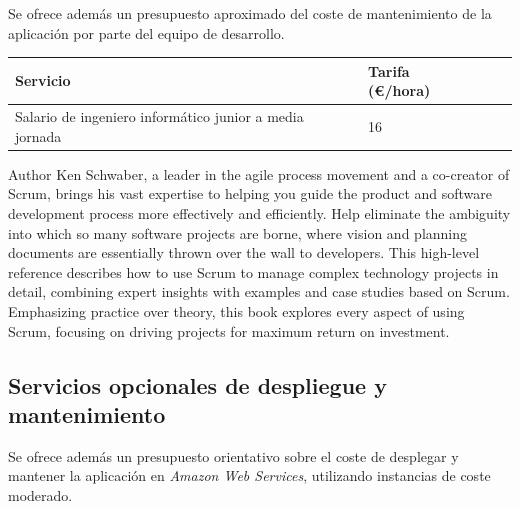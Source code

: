 \documentclass[10pt, a4paper]{aqademic}
\begin{document}
Se ofrece además un presupuesto aproximado del coste de mantenimiento de la aplicación por parte del equipo de desarrollo.

\begin{table}[h!]
	\begin{center}
		\begin{tabular}{|l|l|l|l|}
			\hline
			\rowcolor[HTML]{EFEFEF} 
			\textbf{Servicio}                   & \textbf{Tarifa (€/hora)} \\ \hline
			Salario de ingeniero informático junior a media jornada & 16   \\ \hline
		\end{tabular}
	\end{center}
\end{table}
 Author Ken Schwaber, a leader in the agile process movement and a co-creator of Scrum, brings his vast expertise to helping you guide the product and software development process more effectively and efficiently. Help eliminate the ambiguity into which so many software projects are borne, where vision and planning documents are essentially thrown over the wall to developers. This high-level reference describes how to use Scrum to manage complex technology projects in detail, combining expert insights with examples and case studies based on Scrum. Emphasizing practice over theory, this book explores every aspect of using Scrum, focusing on driving projects for maximum return on investment.


\subsection*{Servicios opcionales de despliegue y mantenimiento}

Se ofrece además un presupuesto orientativo sobre el coste de desplegar y mantener la aplicación en \textit{Amazon Web Services}, utilizando instancias de coste moderado.
\end{document}
